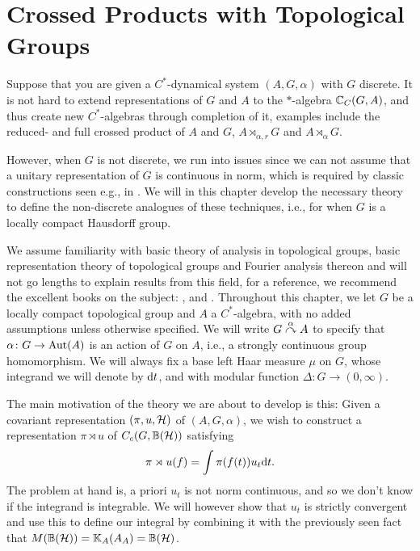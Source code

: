 \chapter{Crossed Products with Topological Groups}
Suppose that you are given a $C^*$-dynamical system $(A,G,\alpha)$ with $G$ discrete. It is not hard to extend representations of $G$ and $A$ to the $*$-algebra $\mathbb{C}_C(G,A)$, and thus create new $C^*$-algebras through completion of it, examples include the reduced- and full crossed product of $A$ and $G$, $A \rtimes_{\alpha,r} G$ and $A \rtimes_{\alpha} G$.

However, when $G$ is not discrete, we run into issues since we can not assume that a unitary representation of $G$ is continuous in norm, which is required by classic constructions seen e.g., in \cite{brown2008c}. We will in this chapter develop the necessary theory to define the non-discrete analogues of these techniques, i.e., for when $G$ is a locally compact Hausdorff group.

We assume familiarity with basic theory of analysis in topological groups, basic representation theory of topological groups and Fourier analysis thereon and will not go lengths to explain results from this field, for a reference, we recommend the excellent books on the subject: \cite{folland2016fourier}, \cite{berg1984harmonic} and \cite{folland2013real}. 
Throughout this chapter, we let $G$ be a locally compact topological group and $A$ a $C^*$-algebra, with no added assumptions unless otherwise specified. We will write $G \stackrel{\alpha}{\curvearrowright} A$ to specify that $\alpha \colon G \to \operatorname{Aut}(A)$ is an action of $G$ on $A$, i.e., a strongly continuous group homomorphism. We will always fix a base left Haar measure $\mu$ on $G$, whose integrand we will denote by $\mathrm{d} t$, and with modular function $\Delta \colon G \to (0,\infty)$. 

The main motivation of the theory we are about to develop is this: Given a covariant representation $(\pi,u,\mathcal{H})$ of $(A,G,\alpha)$, we wish to construct a representation $\pi \rtimes u$ of $C_c(G,\mathbb{B}(\mathcal{H}))$ satisfying 
\begin{align*}
	\pi \rtimes u (f) = \int \pi(f(t))u_t \mathrm{d} t.
\end{align*}
The problem at hand is, a priori $u_t$ is not norm continuous, and so we don't know if the integrand is integrable. We will however show that $u_t$ is strictly convergent and use this to define our integral by combining it with the previously seen fact that $M(\mathbb{B}(\mathcal{H})) = \mathbb{K}_A(A_A)= \mathbb{B}(\mathcal{H})$. 

